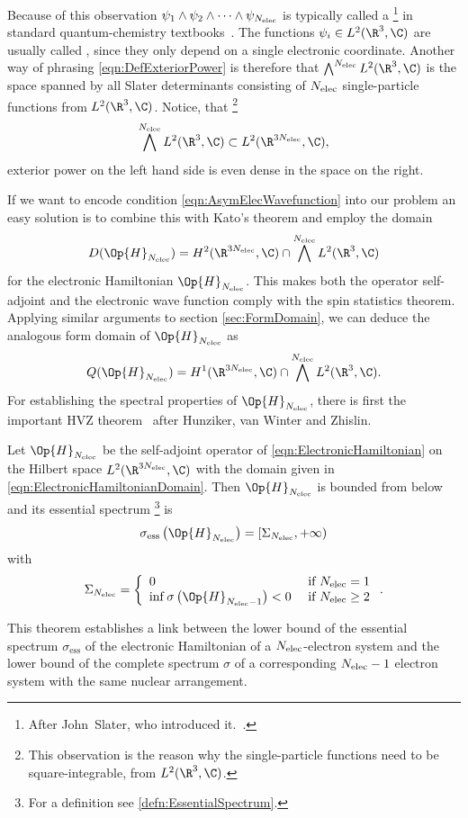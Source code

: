 Because of this observation $\psi_1 \wedge \psi_2 \wedge \cdots \wedge \psi_{N_\text{elec}}$
is typically called a %
\footnote{After John~Slater, who introduced it.~\cite{Slater1929,Slater1930a}.}
in standard quantum-chemistry textbooks~\cite{Szabo1996,Helgaker2013}.
The functions $\psi_i \in L^2(\R^3, \C)$
are usually called ,
since they only depend on a single electronic coordinate.
Another way of phrasing \eqref{eqn:DefExteriorPower}
is therefore that $\bigwedge^{\Nelec} L^2(\R^3, \C)$
is the space spanned by all Slater determinants
consisting of $N_\text{elec}$ single-particle functions from $L^2(\R^3, \C)$.
Notice, that%
\footnote{%
	This observation is the reason why the single-particle functions
	need to be square-integrable, \ie from $L^2(\R^3, \C)$.
}
\[ \bigwedge^{\Nelec} L^2(\R^3, \C) \subset L^2(\R^{3\Nelec}, \C), \]
exterior power on the left hand side is even dense in the space on the right.

If we want to encode condition \eqref{eqn:AsymElecWavefunction}
into our problem an easy solution is to combine this with Kato's theorem
and employ the domain
\begin{equation}
	D(\Op{H}_{\Nelec}) = H^2(\R^{3\Nelec}, \C) \cap \bigwedge^{\Nelec} L^2(\R^3, \C)
	\label{eqn:ElectronicHamiltonianDomain}
\end{equation}
for the electronic Hamiltonian $\Op{H}_{\Nelec}$.
This makes both the operator self-adjoint and the electronic wave function
comply with the spin statistics theorem.
Applying similar arguments to section \vref{sec:FormDomain},
we can deduce the analogous form domain of $\Op{H}_{\Nelec}$ as
\[ Q(\Op{H}_{\Nelec}) = H^1(\R^{3\Nelec}, \C) \cap \bigwedge^{\Nelec} L^2(\R^3, \C). \]
For establishing the spectral properties of $\Op{H}_{\Nelec}$,
there is first the important HVZ theorem~\cite{Zhislin1959,Zhislin1960,Reed1978,Teschl2014}
after Hunziker, van Winter and Zhislin.
\begin{thm}[HVZ]
	\label{thm:HVZ}
	Let $\Op{H}_{\Nelec}$ be the self-adjoint operator of \eqref{eqn:ElectronicHamiltonian}
	on the Hilbert space $L^2(\R^{3\Nelec}, \C)$
	with the domain given in \eqref{eqn:ElectronicHamiltonianDomain}.
	Then $\Op{H}_{\Nelec}$ is bounded from below and
	its essential spectrum%
	\footnote{For a definition see \vref{defn:EssentialSpectrum}.} is
	\[ \sigma_\text{ess}\left(\Op{H}_{\Nelec}\right) = [\Sigma_{\Nelec}, +\infty) \]
	with
	\[ \Sigma_{\Nelec} = \left\{
		\begin{array}{ll}
			0 & \text{ if $\Nelec = 1$} \\
			\inf \sigma\left(\Op{H}_{\Nelec-1}\right) < 0 & \text{ if $\Nelec \geq 2$}
		\end{array}
		\right. .
	\]
\end{thm}
This theorem establishes a link between
the lower bound of the essential spectrum $\sigma_\text{ess}$
of the electronic Hamiltonian of a $N_\text{elec}$-electron system
and the lower bound of the complete spectrum $\sigma$ of
a corresponding $N_\text{elec} - 1$ electron system
with the same nuclear arrangement.

